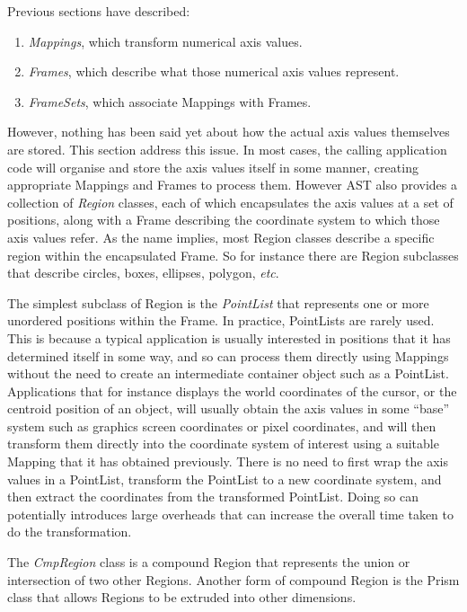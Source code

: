 \documentclass[final,authoryear,5p,times,twocolumn]{elsarticle}
\begin{document}
Previous sections have described:

\begin{enumerate}
\item \emph{Mappings}, which transform numerical axis values.
\item \emph{Frames}, which describe what those numerical axis values
represent.
\item \emph{FrameSets}, which associate Mappings with Frames.
\end{enumerate}

However, nothing has been said yet about how the actual axis values
themselves are stored. This section address this issue. In most cases,
the calling application code will organise and store the axis values
itself in some manner, creating appropriate Mappings and Frames to
process them. However AST also provides a collection of \emph{Region}
classes, each of which encapsulates the axis values at a set of positions,
along with a Frame describing the coordinate system to which those axis
values refer.  As the name implies, most Region classes describe a
specific region within the encapsulated Frame. So for instance there
are Region subclasses that describe circles, boxes, ellipses, polygon,
\emph{etc}.

The simplest subclass of Region is the \emph{PointList} that represents
one or more unordered positions within the Frame.  In practice, PointLists
are rarely used. This is because a typical application is usually
interested in positions that it has determined itself in some way, and
so can process them directly using Mappings without the need to create
an intermediate container object such as a PointList. Applications
that for instance displays the world coordinates of the cursor, or the
centroid position of an object, will usually obtain the axis values in
some ``base'' system such as graphics screen coordinates or pixel
coordinates, and will then transform them directly into the coordinate
system of interest using a suitable Mapping that it has obtained
previously. There is no need to first wrap the axis values in a
PointList, transform the PointList to a new coordinate system, and
then extract the coordinates from the transformed PointList. Doing so
can potentially introduces large overheads that can increase the
overall time taken to do the transformation.

The \emph{CmpRegion} class is a compound Region that represents the
union or intersection of two other Regions. Another form of compound
Region is the Prism class that allows Regions to be extruded into other
dimensions.
\end{document}
